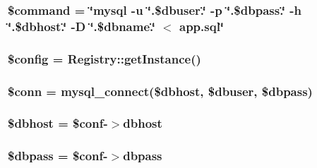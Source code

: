 \subsubsection[{\$command}]{\setlength{\rightskip}{0pt plus 5cm}\$command = \char`\"{}mysql -\/u \char`\"{}.\$dbuser.\char`\"{} -\/p \char`\"{}.\$dbpass.\char`\"{} -\/h \char`\"{}.\$dbhost.\char`\"{} -\/D \char`\"{}.\$dbname.\char`\"{} $<$ app.\+sql\char`\"{}}\label{create_8php_a8f120409eb9f635ac30b3f9a6d5becdc}
\hypertarget{create_8php_a49c7011be9c979d9174c52a8b83e5d8e}{}
\subsubsection[{\$config}]{\setlength{\rightskip}{0pt plus 5cm}\$config = {\bf Registry\+::get\+Instance}()}\label{create_8php_a49c7011be9c979d9174c52a8b83e5d8e}
\hypertarget{create_8php_aa8a5a87b9c1a6a0819b88447cbe41877}{}
\subsubsection[{\$conn}]{\setlength{\rightskip}{0pt plus 5cm}\$conn = mysql\+\_\+connect(\$dbhost, \$dbuser, \$dbpass)}\label{create_8php_aa8a5a87b9c1a6a0819b88447cbe41877}
\hypertarget{create_8php_a580dd98ba7f04c133d1a1e1b01af4a30}{}
\subsubsection[{\$dbhost}]{\setlength{\rightskip}{0pt plus 5cm}\$dbhost = \$conf-\/$>$dbhost}\label{create_8php_a580dd98ba7f04c133d1a1e1b01af4a30}
\hypertarget{create_8php_a95e283b6dd5867f7b99c160bebf9826c}{}
\subsubsection[{\$dbpass}]{\setlength{\rightskip}{0pt plus 5cm}\$dbpass = \$conf-\/$>$dbpass}\label{create_8php_a95e283b6dd5867f7b99c160bebf9826c}
\hypertarget{create_8php_a8d5ac1c3396a540f025f9bbe56a5b568}{}
